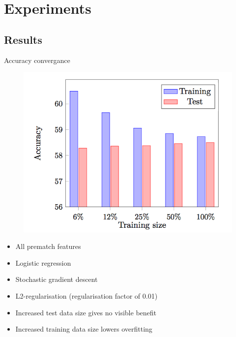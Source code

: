 \section{Experiments}
\subsection{Results}
\begin{frame}{Accuracy convergance}
\begin{minipage}{0.55\linewidth} 
  \begin{figure}[H]
    \includegraphics[width=\linewidth]{experiments/convergence.png}
  \end{figure}
\end{minipage}
\begin{minipage}{0.40\linewidth} 
\begin{itemize}
\item All prematch features
\item Logistic regression
\item Stochastic gradient descent 
\item L2-regularisation (regularisation factor of 0.01)
\end{itemize}
\vspace{0.05cm}
\begin{itemize}
\item Increased test data size gives no visible benefit
\item Increased training data size lowers overfitting
\end{itemize}
\end{minipage}
\end{frame}

